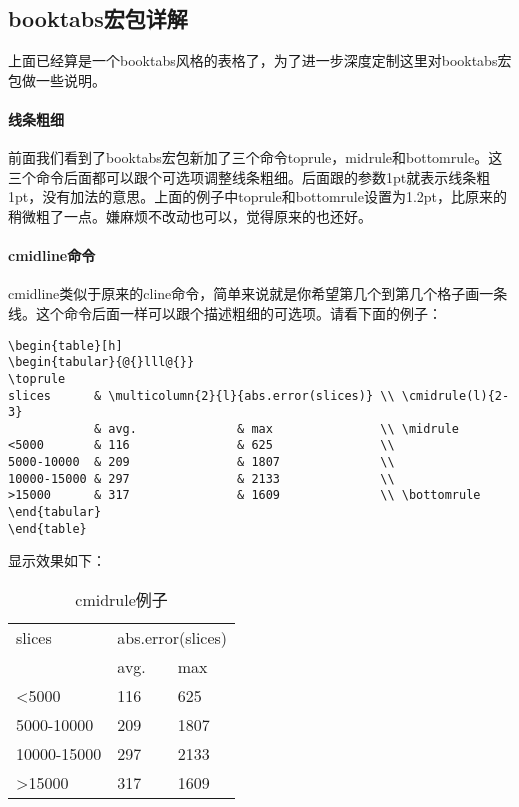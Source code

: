 \subsection{booktabs宏包详解}
上面已经算是一个booktabs风格的表格了，为了进一步深度定制这里对booktabs宏包做一些说明。

\paragraph{线条粗细}
前面我们看到了booktabs宏包新加了三个命令toprule，midrule和bottomrule。这三个命令后面都可以跟个可选项调整线条粗细。后面跟的参数1pt就表示线条粗1pt，没有加法的意思。上面的例子中toprule和bottomrule设置为1.2pt，比原来的稍微粗了一点。嫌麻烦不改动也可以，觉得原来的也还好。

\paragraph{cmidline命令}
cmidline类似于原来的cline命令，简单来说就是你希望第几个到第几个格子画一条线。这个命令后面一样可以跟个描述粗细的可选项。请看下面的例子：

\begin{verbatim}
\begin{table}[h]
\begin{tabular}{@{}lll@{}}
\toprule
slices      & \multicolumn{2}{l}{abs.error(slices)} \\ \cmidrule(l){2-3} 
            & avg.              & max               \\ \midrule
<5000       & 116               & 625               \\
5000-10000  & 209               & 1807              \\
10000-15000 & 297               & 2133              \\
>15000      & 317               & 1609              \\ \bottomrule
\end{tabular}
\end{table}
\end{verbatim}

显示效果如下：
\begin{table}[h]
\begin{tabular}{@{}lll@{}}
\toprule
slices      & \multicolumn{2}{l}{abs.error(slices)} \\ \cmidrule(l){2-3} 
            & avg.              & max               \\ \midrule
<5000       & 116               & 625               \\
5000-10000  & 209               & 1807              \\
10000-15000 & 297               & 2133              \\
>15000      & 317               & 1609              \\ \bottomrule
\end{tabular}
\caption{cmidrule例子}
\label{tab:cmidrule例子}
\end{table}

